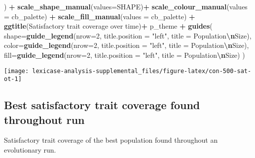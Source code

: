 \documentclass[
]{book}
\newenvironment{Shaded}{\begin{snugshade}}{\end{snugshade}}
\newcommand{\AttributeTok}[1]{\textcolor[rgb]{0.13,0.29,0.53}{#1}}
\newcommand{\DecValTok}[1]{\textcolor[rgb]{0.00,0.00,0.81}{#1}}
\newcommand{\FunctionTok}[1]{\textcolor[rgb]{0.13,0.29,0.53}{\textbf{#1}}}
\newcommand{\NormalTok}[1]{#1}
\newcommand{\SpecialCharTok}[1]{\textcolor[rgb]{0.81,0.36,0.00}{\textbf{#1}}}
\newcommand{\StringTok}[1]{\textcolor[rgb]{0.31,0.60,0.02}{#1}}
\begin{document}
\begin{Shaded}
\begin{Highlighting}[]
\NormalTok{  ) }\SpecialCharTok{+}
  \FunctionTok{scale\_shape\_manual}\NormalTok{(}\AttributeTok{values=}\NormalTok{SHAPE)}\SpecialCharTok{+}
  \FunctionTok{scale\_colour\_manual}\NormalTok{(}\AttributeTok{values =}\NormalTok{ cb\_palette) }\SpecialCharTok{+}
  \FunctionTok{scale\_fill\_manual}\NormalTok{(}\AttributeTok{values =}\NormalTok{ cb\_palette) }\SpecialCharTok{+}
  \FunctionTok{ggtitle}\NormalTok{(}\StringTok{\textquotesingle{}Satisfactory trait coverage over time\textquotesingle{}}\NormalTok{)}\SpecialCharTok{+}
\NormalTok{  p\_theme }\SpecialCharTok{+}
  \FunctionTok{guides}\NormalTok{(}
    \AttributeTok{shape=}\FunctionTok{guide\_legend}\NormalTok{(}\AttributeTok{nrow=}\DecValTok{2}\NormalTok{, }\AttributeTok{title.position =} \StringTok{"left"}\NormalTok{, }\AttributeTok{title =} \StringTok{\textquotesingle{}Population}\SpecialCharTok{\textbackslash{}n}\StringTok{Size\textquotesingle{}}\NormalTok{),}
    \AttributeTok{color=}\FunctionTok{guide\_legend}\NormalTok{(}\AttributeTok{nrow=}\DecValTok{2}\NormalTok{, }\AttributeTok{title.position =} \StringTok{"left"}\NormalTok{, }\AttributeTok{title =} \StringTok{\textquotesingle{}Population}\SpecialCharTok{\textbackslash{}n}\StringTok{Size\textquotesingle{}}\NormalTok{),}
    \AttributeTok{fill=}\FunctionTok{guide\_legend}\NormalTok{(}\AttributeTok{nrow=}\DecValTok{2}\NormalTok{, }\AttributeTok{title.position =} \StringTok{"left"}\NormalTok{, }\AttributeTok{title =} \StringTok{\textquotesingle{}Population}\SpecialCharTok{\textbackslash{}n}\StringTok{Size\textquotesingle{}}\NormalTok{)}
\NormalTok{  )}
\end{Highlighting}
\end{Shaded}

\texttt{[image: lexicase-analysis-supplemental\_files/figure-latex/con-500-sat-ot-1]}

\hypertarget{best-satisfactory-trait-coverage-found-throughout-run-4}{%
\subsection{Best satisfactory trait coverage found throughout run}\label{best-satisfactory-trait-coverage-found-throughout-run-4}}

Satisfactory trait coverage of the best population found throughout an evolutionary run.
\end{document}
